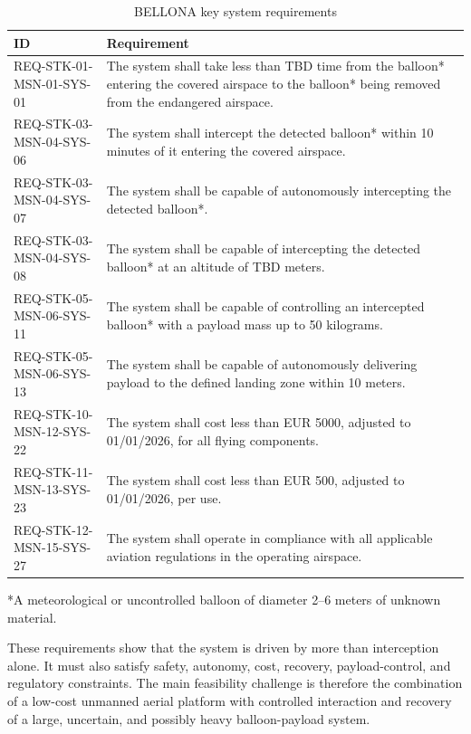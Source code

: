 \begin{table}[h]
\centering
\caption{BELLONA key system requirements}
\label{tab:executive_key_requirements}
\begin{tabular}{p{}p{}}
\toprule
\textbf{ID} & \textbf{Requirement} \\
\midrule
REQ-STK-01-MSN-01-SYS-01 & The system shall take less than TBD time from the balloon* entering the covered airspace to the balloon* being removed from the endangered airspace. \\
REQ-STK-03-MSN-04-SYS-06 & The system shall intercept the detected balloon* within 10 minutes of it entering the covered airspace. \\
REQ-STK-03-MSN-04-SYS-07 & The system shall be capable of autonomously intercepting the detected balloon*. \\
REQ-STK-03-MSN-04-SYS-08 & The system shall be capable of intercepting the detected balloon* at an altitude of TBD meters. \\
REQ-STK-05-MSN-06-SYS-11 & The system shall be capable of controlling an intercepted balloon* with a payload mass up to 50 kilograms. \\
REQ-STK-05-MSN-06-SYS-13 & The system shall be capable of autonomously delivering payload to the defined landing zone within 10 meters. \\
REQ-STK-10-MSN-12-SYS-22 & The system shall cost less than EUR 5000, adjusted to 01/01/2026, for all flying components. \\
REQ-STK-11-MSN-13-SYS-23 & The system shall cost less than EUR 500, adjusted to 01/01/2026, per use. \\
REQ-STK-12-MSN-15-SYS-27 & The system shall operate in compliance with all applicable aviation regulations in the operating airspace. \\
\bottomrule
\end{tabular}

\vspace{2mm}
\raggedright
\small{*A meteorological or uncontrolled balloon of diameter 2--6 meters of unknown material.}
\end{table}

These requirements show that the system is driven by more than interception alone. It must also satisfy safety, autonomy, cost, recovery, payload-control, and regulatory constraints. The main feasibility challenge is therefore the combination of a low-cost unmanned aerial platform with controlled interaction and recovery of a large, uncertain, and possibly heavy balloon-payload system.

